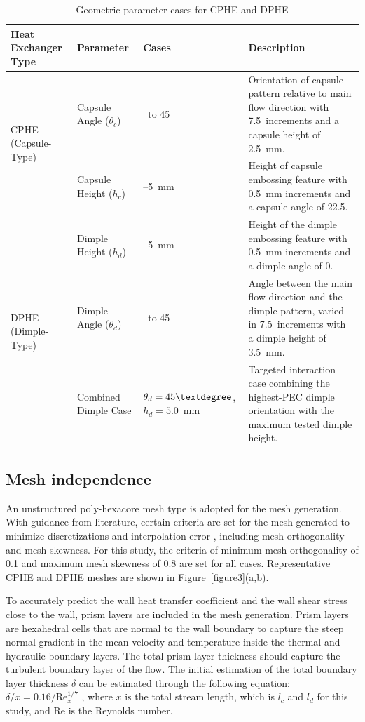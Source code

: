 \documentclass[energies,article,submit,moreauthors,noheaderline]{Definitions/mdpi}
\newcommand{\degree}{\texorpdfstring{\ensuremath{^\circ}}{\textdegree}}
\def\ensuremath#1{}%
\def\degree{\textdegree}%
\begin{document}
\begin{table}[H]
\centering
\caption{Geometric parameter cases for CPHE and DPHE}
\label{tab:geom_cases}
\footnotesize
\renewcommand{\arraystretch}{1}
\begin{tabularx}{\textwidth}{ll>{\raggedright\arraybackslash}l>{\raggedright\arraybackslash}X}
\hline
\textbf{Heat Exchanger Type} & \textbf{Parameter} & \textbf{Cases} & \textbf{Description} \\ \hline
\multirow{2}{*}{CPHE (Capsule-Type)} 
& Capsule Angle ($\theta_c$) & 0\degree\ to 45\degree & Orientation of capsule pattern relative to main flow direction with 7.5\degree\ increments and a capsule height of 2.5~mm. \\
& Capsule Height ($h_c$) & 2--5~mm & Height of capsule embossing feature with 0.5~mm increments and a capsule angle of 22.5\degree. \\ \hline
\multirow{3}{*}{DPHE (Dimple-Type)} 
& Dimple Height ($h_d$) & 2--5~mm & Height of the dimple embossing feature with 0.5~mm increments and a dimple angle of 0\degree. \\
& Dimple Angle ($\theta_d$) & 0\degree\ to 45\degree & Angle between the main flow direction and the dimple pattern, varied in 7.5\degree\ increments with a dimple height of 3.5~mm. \\
& Combined Dimple Case & $\theta_d=45\degree$, $h_d=5.0$~mm & Targeted interaction case combining the highest-PEC dimple orientation with the maximum tested dimple height. \\ \hline
\end{tabularx}
\end{table}

\subsection{Mesh independence}
\label{sec:mesh}

An unstructured poly-hexacore mesh type is adopted for the mesh generation. With guidance from literature, certain criteria are set for the mesh generated to minimize discretizations and interpolation error \citep{sorgente2023, juretic2010}, including mesh orthogonality and mesh skewness. For this study, the criteria of minimum mesh orthogonality of 0.1 and maximum mesh skewness of 0.8 are set for all cases. Representative CPHE and DPHE meshes are shown in Figure~\ref{figure3}(a,b).

To accurately predict the wall heat transfer coefficient and the wall shear stress close to the wall, prism layers are included in the mesh generation. Prism layers are hexahedral cells that are normal to the wall boundary to capture the steep normal gradient in the mean velocity and temperature inside the thermal and hydraulic boundary layers. The total prism layer thickness should capture the turbulent boundary layer of the flow. The initial estimation of the total boundary layer thickness $\delta$ can be estimated through the following equation: $\delta/x = 0.16/\text{Re}_x^{1/7}$ \citep{cengel2014}, where $x$ is the total stream length, which is $l_c$ and $l_d$ for this study, and Re is the Reynolds number.
\end{document}
